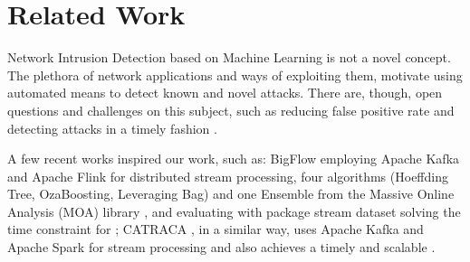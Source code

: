 
\section{Related Work}
\label{sec:related}

Network Intrusion Detection based on Machine Learning is not a novel concept.
The plethora of network applications and 
ways of exploiting them, motivate using automated means to detect known and novel attacks. 
There are, though, open questions and challenges on this subject, such as
reducing false positive rate and detecting attacks in a timely fashion \cite{DaCosta2019a}.

A few recent works inspired our work, such as: BigFlow \cite{Viegas2019}
employing Apache Kafka and Apache Flink for distributed stream processing,
four algorithms (Hoeffding Tree, OzaBoosting, Leveraging Bag) and one Ensemble
from the Massive Online Analysis (MOA) library \cite{MOA}, and
evaluating with package stream dataset solving the time constraint for \nids;
CATRACA \cite{Lopez2018,AndreoniLopez2019a}, in a similar way, uses 
Apache Kafka and Apache Spark for stream processing and also achieves
a timely and scalable \nids.


